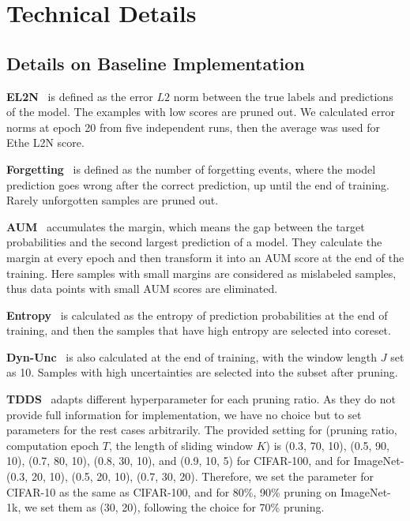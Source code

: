 \section{Technical Details}

\subsection{Details on Baseline Implementation}
\label{Appendix_Technical_Details_of_Baselines}
\textbf{EL2N}~\citep{paul2021deep} is defined as the error $L2$ norm between the true labels and predictions of the model. The examples with low scores are pruned out. We calculated error norms at epoch 20 from five independent runs, then the average was used for Ethe L2N score.

\textbf{Forgetting}~\citep{toneva2018empirical} is defined as the number of forgetting events, where the model prediction goes wrong after the correct prediction, up until the end of training. Rarely unforgotten samples are pruned out.

\textbf{AUM}~\citep{pleiss2020identifyingmislabeleddatausing} accumulates the margin, which means the gap between the target probabilities and the second largest prediction of a model. They calculate the margin at every epoch and then transform it into an AUM score at the end of the training. Here samples with small margins are considered as mislabeled samples, thus data points with small AUM scores are eliminated.

\textbf{Entropy}~\citep{coleman2020selectionproxyefficientdata} is calculated as the entropy of prediction probabilities at the end of training, and then the samples that have high entropy are selected into coreset. 

\textbf{Dyn-Unc}~\citep{he2024large} is also calculated at the end of training, with the window length $J$ set as 10. Samples with high uncertainties are selected into the subset after pruning.

\textbf{TDDS}~\citep{zhang2024spanning} adapts different hyperparameter for each pruning ratio. As they do not provide full information for implementation, we have no choice but to set parameters for the rest cases arbitrarily.
The provided setting for (pruning ratio, computation epoch $T$, the length of sliding window $K$) is (0.3, 70, 10), (0.5, 90, 10), (0.7, 80, 10), (0.8, 30, 10), and (0.9, 10, 5) for CIFAR-100, and for ImageNet-(0.3, 20, 10), (0.5, 20, 10), (0.7, 30, 20). Therefore, we set the parameter for CIFAR-10 as the same as CIFAR-100, and for 80\%, 90\% pruning on ImageNet-1k, we set them as (30, 20), following the choice for 70\% pruning.

